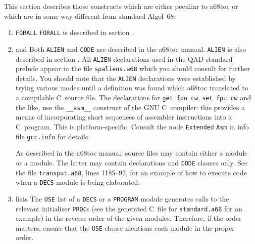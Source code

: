 This section describes those constructs which are either peculiar to
a68toc or which are in some way different from standard Algol~68.
\begin{enumerate}
\item \verb|FORALL|\newline
\verb|FORALL| is described in section .

\item {} and \newline
Both \verb|ALIEN| and \verb|CODE| are described in the a68toc manual.
\verb|ALIEN| is also described in section . All
\verb|ALIEN| declarations used in the QAD standard prelude appear in
the file \verb|spaliens.a68| which you should consult for further
details.  You should note that the \verb|ALIEN| declarations were
established by trying various modes until a definition was found
which a68toc translated to a compilable C~source file. The
declarations for \verb|get fpu cw|, \verb|set fpu cw| and the like,
use the \verb|__asm__| construct of the GNU C~compiler: this provides
a means of incorporating short sequences of assembler instructions
into a C~program. This is platform-specific. Consult the node \verb|Extended| \verb|Asm| in info
file \verb|gcc.info| for details.

As described in the a68toc manual, source files may contain either a
 module or a  module. The latter may contain
declarations and \verb|CODE| clauses only. See the file
\verb|transput.a68|, lines 1185--92, for an example of how to execute
code when a \verb|DECS| module is being elaborated.

\item {} lists\newline
The \verb|USE| list of a \verb|DECS| or a \verb|PROGRAM| module
generates calls to the relevant initialiser \verb|PROC|s (see the
generated C~file for \verb|standard.a68| for an example) in the reverse
order of the given modules. Therefore, if the order matters, ensure
that the \verb|USE| clause mentions each module in the proper order.


\end{enumerate}
